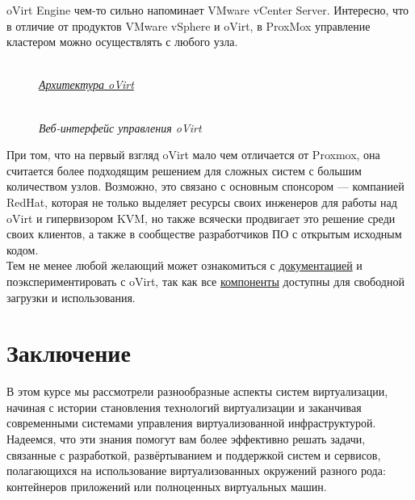 \documentclass[14pt, a4paper]{article}
\begin{document}
oVirt Engine чем-то сильно напоминает VMware vCenter Server. Интересно, что в отличие от продуктов
VMware vSphere и oVirt, в ProxMox управление кластером можно осуществлять с любого узла.

\begin{figure}[h]
    \centering
    \\ 
    \small\textit{\href{https://www.ovirt.org/develop/architecture/architecture.html}{Архитектура oVirt}}  
    \label{framework} 
\end{figure}

\newpage

\begin{figure}[h]
    \centering
    \\ 
    \small\textit{Веб-интерфейс управления oVirt}  
    \label{framework} 
\end{figure}

При том, что на первый взгляд oVirt мало чем отличается от Proxmox, она считается более
подходящим решением для сложных систем с большим количеством узлов. Возможно, это связано с
основным спонсором — компанией RedHat, которая не только выделяет ресурсы своих инженеров
для работы над oVirt и гипервизором KVM, но также всячески продвигает это решение среди своих
клиентов, а также в сообществе разработчиков ПО с открытым исходным кодом.\\

Тем не менее любой желающий может ознакомиться с \href{https://www.ovirt.org/documentation/}{документацией} и поэкспериментировать с oVirt,
так как все \href{https://www.ovirt.org/download/}{компоненты} доступны для свободной загрузки и использования.

\section*{Заключение} 

В этом курсе мы рассмотрели разнообразные аспекты систем виртуализации, начиная с истории
становления технологий виртуализации и заканчивая современными системами управления
виртуализованной инфраструктурой. Надеемся, что эти знания помогут вам более эффективно
решать задачи, связанные с разработкой, развёртыванием и поддержкой систем и сервисов,
полагающихся на использование виртуализованных окружений разного рода: контейнеров
приложений или полноценных виртуальных машин.
\end{document}
